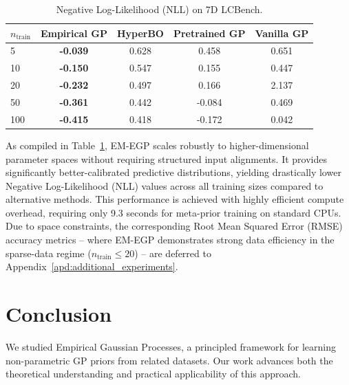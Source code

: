 \documentclass{article}
\begin{document}
\begin{table}[ht]
\small
\centering
\caption{Negative Log-Likelihood (NLL) on 7D LCBench.}
\label{tab:hd_nll}
\setlength{\tabcolsep}{4pt}
\begin{tabular}{lcccc}
\toprule
$n_{\text{train}}$ & Empirical GP & HyperBO & Pretrained GP & Vanilla GP \\
\midrule
5   & \textbf{-0.039} & 0.628 & 0.458  & 0.651 \\
10  & \textbf{-0.150} & 0.547 & 0.155  & 0.447 \\
20  & \textbf{-0.232} & 0.497 & 0.166  & 2.137 \\
50  & \textbf{-0.361} & 0.442 & -0.084 & 0.469 \\
100 & \textbf{-0.415} & 0.418 & -0.172 & 0.042 \\
\bottomrule
\end{tabular}
\end{table}

As compiled in Table~\ref{tab:hd_nll}, EM-EGP scales robustly to higher-dimensional parameter spaces without requiring structured input alignments. It provides significantly better-calibrated predictive distributions, yielding drastically lower Negative Log-Likelihood (NLL) values across all training sizes compared to alternative methods. This performance is achieved with highly efficient compute overhead, requiring only 9.3 seconds for meta-prior training on standard CPUs. Due to space constraints, the corresponding Root Mean Squared Error (RMSE) accuracy metrics -- where EM-EGP demonstrates strong data efficiency in the sparse-data regime ($n_{\text{train}} \le 20$)
--
are deferred to Appendix~\ref{apd:additional_experiments}.

\section{Conclusion}
\label{sec:Conclusion}


We studied Empirical Gaussian Processes, a principled framework for learning non-parametric GP priors from related datasets. Our work advances both the theoretical understanding and practical applicability of this approach.
\end{document}
